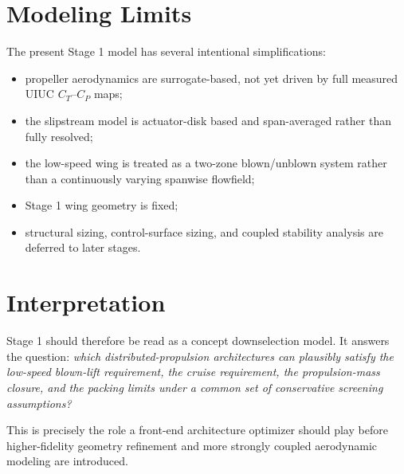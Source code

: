 \documentclass[11pt]{article}
\begin{document}
\section{Modeling Limits}

The present Stage 1 model has several intentional simplifications:
\begin{itemize}[leftmargin=1.5em]
\item propeller aerodynamics are surrogate-based, not yet driven by full measured UIUC \(C_T\)--\(C_P\) maps;
\item the slipstream model is actuator-disk based and span-averaged rather than fully resolved;
\item the low-speed wing is treated as a two-zone blown/unblown system rather than a continuously varying spanwise flowfield;
\item Stage 1 wing geometry is fixed;
\item structural sizing, control-surface sizing, and coupled stability analysis are deferred to later stages.
\end{itemize}

\section{Interpretation}

Stage 1 should therefore be read as a concept downselection model. It answers the question:
\emph{which distributed-propulsion architectures can plausibly satisfy the low-speed blown-lift requirement, the cruise requirement, the propulsion-mass closure, and the packing limits under a common set of conservative screening assumptions?}

This is precisely the role a front-end architecture optimizer should play before higher-fidelity geometry refinement and more strongly coupled aerodynamic modeling are introduced.
\end{document}
